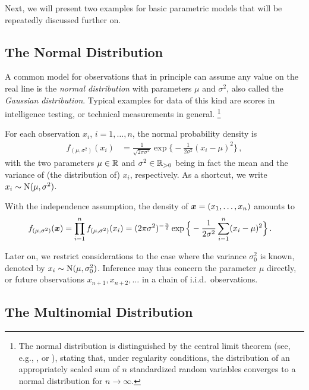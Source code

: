 Next, we will present two examples for basic parametric models that will be repeatedly discussed further on.


\subsection{The Normal Distribution}
\label{sec:normaldist}

A common model for observations that in principle can assume any value on the real line
is the \emph{normal distribution} with parameters $\mu$ and $\sigma^2$, also called the \emph{Gaussian distribution}.
Typical examples for data of this kind are scores in intelligence testing, or technical measurements in general.%
\footnote{The normal distribution is distinguished by the central limit theorem
(see, e.g., \cite[\S 7.3]{1993:karr}, or \cite[\S 9]{1968:breiman}), stating that, under regularity conditions,
the distribution of an appropriately scaled sum of $n$ standardized random variables converges to a normal distribution
for $n \to \infty$.}

For each observation $x_i$, $i=1,\ldots, n$, the normal probability density is
\begin{align*}
f_{(\mu, \sigma^2)}(x_{i}) &= \frac{1}{\sqrt{2\pi\sigma^2}}\exp\Big\{ -\frac{1}{2\sigma^2}(x_{i} - \mu)^2 \Big\}\,,
\end{align*}
with the two parameters $\mu \in \mathbb{R}$ and $\sigma^2 \in \mathbb{R}_{>0}$
being in fact the mean and the variance of (the distribution of) $x_i$, respectively.
As a shortcut, we write $x_i \sim \operatorname{N}(\mu, \sigma^2)$.

With the independence assumption, the density of ${\bm x} = (x_1,\ldots,x_n)$ amounts to
\begin{align}\label{eq:normaldens}
f_{(\mu, \sigma^2)}({\bm x})
 &= \prod_{i=1}^n f_{(\mu, \sigma^2)}(x_{i})
  = (2\pi\sigma^2)^{-\frac{n}{2}}\exp\Big\{ -\frac{1}{2\sigma^2}\sum_{i=1}^n (x_{i} - \mu)^2 \Big\}\,.
\end{align}

Later on, we restrict considerations to the case where the variance $\sigma_0^2$ is known, denoted by $x_i \sim \operatorname{N}(\mu, \sigma_0^2)$.
Inference may thus concern the parameter $\mu$ directly, or future observations $x_{n+1}, x_{n+2}, \ldots$ in a chain of i.i.d.\ observations.


\subsection{The Multinomial Distribution}
\label{sec:multinomdist}


